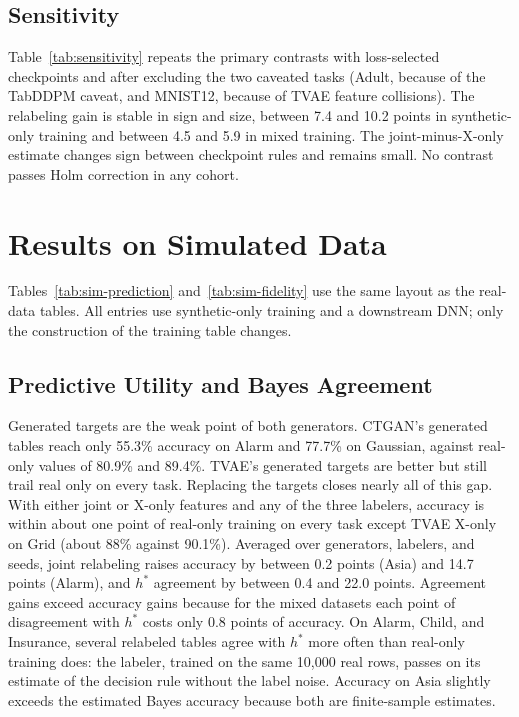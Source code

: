 \documentclass[letterpaper]{article}
\begin{document}
\subsection{Sensitivity}
\label{sec:sensitivity}
Table~\ref{tab:sensitivity} repeats the primary contrasts with
loss-selected checkpoints and after excluding the two caveated tasks
(Adult, because of the TabDDPM caveat, and MNIST12, because of TVAE feature
collisions). The relabeling gain is stable in sign and size, between 7.4
and 10.2 points in synthetic-only training and between 4.5 and 5.9 in
mixed training. The joint-minus-X-only estimate changes sign between
checkpoint rules and remains small. No contrast passes Holm correction in
any cohort.

\section{Results on Simulated Data}


Tables~\ref{tab:sim-prediction} and~\ref{tab:sim-fidelity} use the same
layout as the real-data tables. All entries use synthetic-only training
and a downstream DNN; only the construction of the training table changes.

\subsection{Predictive Utility and Bayes Agreement}
Generated targets are the weak point of both generators. CTGAN's generated
tables reach only 55.3\% accuracy on Alarm and 77.7\% on Gaussian, against
real-only values of 80.9\% and 89.4\%. TVAE's generated targets are better
but still trail real only on every task. Replacing the targets
closes nearly all of this gap. With either joint or X-only features and
any of the three labelers, accuracy is within about one point of real-only
training on every task except TVAE X-only on Grid (about 88\% against
90.1\%). Averaged over generators, labelers, and seeds, joint relabeling
raises accuracy by between 0.2 points (Asia) and 14.7 points (Alarm), and
$h^*$ agreement by between 0.4 and 22.0 points. Agreement gains exceed
accuracy gains because for the mixed datasets each point of disagreement
with $h^*$ costs only 0.8 points of accuracy. On Alarm, Child, and
Insurance, several relabeled tables agree with $h^*$ more often than
real-only training does: the labeler, trained on the same 10,000 real rows,
passes on its estimate of the decision rule without the label noise.
Accuracy on Asia slightly exceeds the estimated Bayes accuracy because
both are finite-sample estimates.
\end{document}
